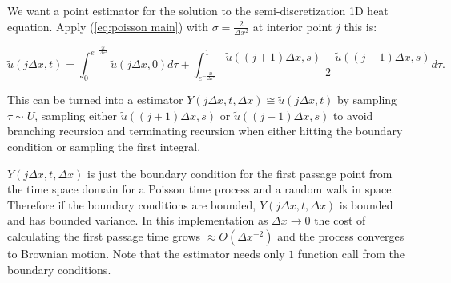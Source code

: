 \documentclass[a4paper,12pt]{article}
\begin{document}
\begin{example} \label{ex: point estimator of semi heat}
  We want a point estimator for the solution to the semi-discretization 1D heat equation. Apply (\ref{eq:poisson main})
  with $\sigma = \frac{2}{\Delta x^{2}}$ at interior point $j$ this is:

  \begin{equation}
    \tilde{u}(j \Delta x,t) = \int_{0}^{e^{-\frac{2t}{\Delta x^{2}}}}  \tilde{u}(j \Delta x,0) d\tau+
    \int_{e^{-\frac{2t}{\Delta x^{2}}}}^{1} \frac{\tilde{u}((j+1) \Delta x,s)+\tilde{u}((j-1) \Delta x,s)}{2}d\tau. \label{eq:int semi heat}
  \end{equation}

  This can be turned into a estimator $Y(j \Delta x,t,\Delta x ) \cong  \tilde{u}(j \Delta x,t)$
  by sampling $\tau \sim U$,
  sampling either $\tilde{u}((j+1) \Delta x,s)$ or $\tilde{u}((j-1) \Delta x,s)$ to avoid branching recursion and
  terminating recursion when either hitting the boundary condition or sampling the first integral.
\end{example}

\begin{julia}\label{jl:point estimator heat}


  $Y(j \Delta x,t,\Delta x )$ is just the boundary condition
  for the first passage point from the time space domain for a Poisson time process and a random walk in space.
  Therefore if the boundary conditions are bounded, $Y(j \Delta x,t,\Delta x )$ is bounded and has bounded variance.
  In this implementation as  $\Delta x \rightarrow 0$  the cost of calculating the first passage time grows
  $\approx O(\Delta x ^{-2})$ and the process converges to Brownian motion. Note that the estimator needs
  only $1$ function call from the boundary conditions.

\end{julia}
\end{document}
